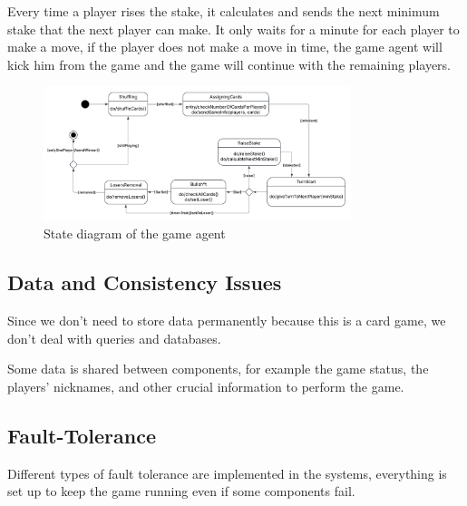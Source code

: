 \documentclass{scrartcl}
\begin{document}
\begin{itemize}
            Every time a player rises the stake, it calculates and sends the next minimum stake that
            the next player can make.
            It only waits for a minute for each player to make a move, if the player does not make a
            move in time, the game agent will kick him from the game and the game will continue with
            the remaining players.
            \begin{figure}
                  \centering
                  \includegraphics[width=0.8\textwidth]{figures/gameAgentStates.png}
                  \caption{State diagram of the game agent}
                  \label{fig:gameAgentStates}
            \end{figure}
\end{itemize}

\subsection{Data and Consistency Issues}\label{data-and-consistency-issues}
Since we don't need to store data permanently because this is a card game, we don't deal with queries
and databases.

Some data is shared between components, for example the game status, the players' nicknames, and
other crucial information to perform the game.

\subsection{Fault-Tolerance}\label{fault-tolerance}
Different types of fault tolerance are implemented in the systems, everything is set up to keep
the game running even if some components fail.
\end{document}
